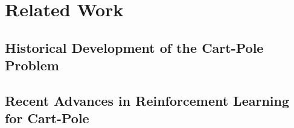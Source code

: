 \chapter{Related Work}

\section{Historical Development of the Cart-Pole Problem}

\section{Recent Advances in Reinforcement Learning for Cart-Pole}